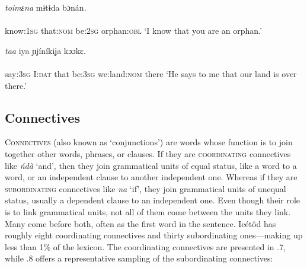 \ea\label{ex:}
   \textit{toimɛna}   mɨtɨda   bɔnán. \\
    \\
know:\textsc{1sg}   that:\textsc{nom}   be:\textsc{2sg}   orphan:\textsc{obl}
\glt ‘I know that you are an orphan.’ 
\z




\ea\label{ex:}
   \textit{taa}   iya     ɲjíníkiʝa    kɔɔkɛ. \\
    \\
say:\textsc{3sg}   I:\textsc{dat}   that   be:\textsc{3sg}  we:land:\textsc{nom} there
\glt ‘He says to me that our land is over there.’ 
\z






\subsection{Connectives}


\textsc{Connectives} (also known as ‘conjunctions’) are words whose function is to join together other words, phrases, or clauses. If they are \textsc{coordinating} connectives like \textit{ńdà} ‘and’, then they join grammatical units of equal status, like a word to a word, or an independent clause to another independent one. Whereas if they are \textsc{subordinating} connectives like \textit{na} ‘if’, they join grammatical units of unequal status, usually a dependent clause to an independent one. Even though their role is to link grammatical units, not all of them come between the units they link. Many come before both, often as the first word in the sentence. Icétôd has roughly eight coordinating connectives and thirty subordinating ones—making up less than 1\% of the lexicon. The coordinating connectives are presented in .7, while .8 offers a representative sampling of the subordinating connectives:


